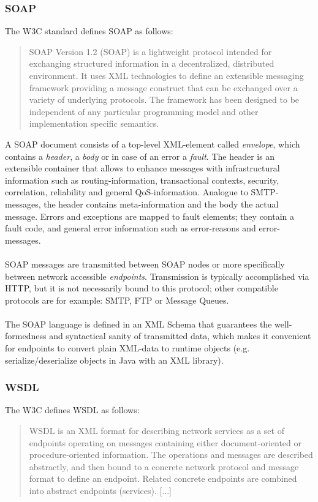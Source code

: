 
\subsubsection{SOAP}

The W3C standard defines SOAP as follows:
\begin{quote}
SOAP Version 1.2 (SOAP) is a lightweight protocol intended for exchanging structured information in a decentralized, distributed environment. It uses XML technologies to define an extensible messaging framework providing a message construct that can be exchanged over a variety of underlying protocols. The framework has been designed to be independent of any particular programming model and other implementation specific semantics. \cite{SOAPCORE}
\end{quote}
A SOAP document consists of a top-level XML-element called \emph{envelope}, which contains a \emph{header}, a \emph{body} or in case of an error a \emph{fault}. The header is an extensible container that allows to enhance messages with infrastructural information such as routing-information, transactional contexts, security, correlation, reliability and general QoS-information. Analogue to SMTP-messages, the header contains meta-information and the body the actual message. Errors and exceptions are mapped to fault elements; they contain a fault code, and general error information such as error-reasons and error-messages.
\\ \\
SOAP messages are transmitted between SOAP nodes or more specifically between network accessible \emph{endpoints}. Transmission is typically accomplished via HTTP, but it is not necessarily bound to this protocol; other compatible protocols are for example: SMTP, FTP or Message Queues. \cite{BIGREST}
\\ \\
The SOAP language is defined in an XML Schema that guarantees the well-formedness and syntactical sanity of transmitted data, which makes it convenient for endpoints to convert plain XML-data to runtime objects (e.g. serialize/deserialize objects in Java with an XML library).

\subsubsection{WSDL}

The W3C defines WSDL as follows:
\begin{quote}
WSDL is an XML format for describing network services as a set of endpoints operating on messages containing either document-oriented or procedure-oriented information. The operations and messages are described abstractly, and then bound to a concrete network protocol and message format to define an endpoint. Related concrete endpoints are combined into abstract endpoints (services). [...] \cite{WSDLCORE}
\end{quote}

